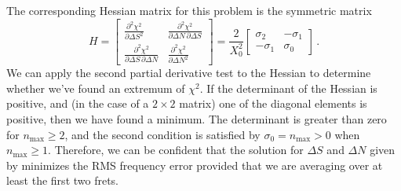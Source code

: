The corresponding Hessian matrix for this problem is the symmetric matrix
 \begin{equation}
H = \begin{bmatrix}
      \frac{\partial^2 \chi^2}{\partial \Delta S^2} & \frac{\partial^2 \chi^2}{\partial \Delta N\, \partial \Delta S} \\
      \frac{\partial^2 \chi^2}{\partial \Delta S\, \partial \Delta N} & \frac{\partial^2 \chi^2}{\partial \Delta N^2}
    \end{bmatrix}
  = \frac{2}{X_0^2} \begin{bmatrix}
      \sigma_2 & -\sigma_1 \\
      -\sigma_1 & \sigma_0
    \end{bmatrix}\, .
 \end{equation}
We can apply the second partial derivative test to the Hessian to determine whether we've found an extremum of $\chi^2$. If the determinant of the Hessian is positive, and (in the case of a $2 \times 2$ matrix) one of the diagonal elements is positive, then we have found a minimum. The determinant is greater than zero for $n_\text{max} \ge 2$, and the second condition is satisfied by $\sigma_0 = n_\text{max} > 0$ when $n_\text{max} \ge 1$. Therefore, we can be confident that the solution for $\Delta S$ and $\Delta N$ given by  minimizes the RMS frequency error provided that we are averaging over at least the first two frets.

